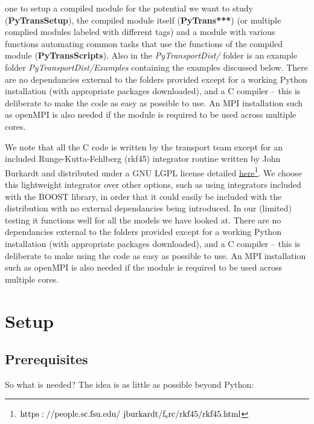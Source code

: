 \documentclass[10pt,
amsmath,amssymb,
aps,prd,nofootinbib,eqsecnum,a4paper]{revtex4}
\newcommand{\CC}{C\nolinebreak\hspace{-.05em}\raisebox{.4ex}{\tiny\bf +}\nolinebreak\hspace{-.10em}\raisebox{.4ex}{\tiny\bf +}}
\def\CC{{C\nolinebreak[4]\hspace{-.05em}\raisebox{.4ex}{\tiny\bf ++}}}
\def\S{ }
\begin{document}
one to setup a compiled module for the potential we want to study ({\bf PyTransSetup}), the compiled module itself ({\bf PyTrans***}) 
(or multiple complied modules labeled with different tags) and a 
module with various functions automating common tasks that 
use the functions of the compiled module ({\bf PyTransScripts}). 
Also in the {\it PyTransportDist/} folder is an example folder {\it PyTransportDist/Examples} 
containing the examples discussed below. 
There are no dependancies external to the folders provided except for a working Python 
installation (with appropriate packages downloaded), and a \CC \S compiler -- this is deliberate to make 
the code as easy as possible to use.
An MPI installation such as openMPI is also needed if the module is required to be 
used across multiple cores. 



We note that all the \CC \S  code is written by the transport team except for an included Runge-Kutta-Fehlberg (rkf45)
integrator routine written by John Burkardt and distributed under a GNU LGPL license detailed \href{https://people.sc.fsu.edu/~jburkardt/f_src/rkf45/rkf45.html}{here}\footnote{$\rm https://people.sc.fsu.edu/~jburkardt/f_src/rkf45/rkf45.html$}.  We choose this lightweight integrator over other options, such as using integrators included with 
the BOOST library, in order that it could easily be included with the distribution with no external dependancies being introduced. 
In our (limited) testing it functions well for all the models we have looked at.
There are no dependancies external to the folders provided except for a working Python 
installation (with appropriate packages downloaded), and a \CC \S compiler -- this is deliberate to make 
using the code as easy as possible to use.
An MPI installation such as openMPI is also needed if the module is required to be 
used across multiple cores. 

\section{Setup}
\label{Setup}

\subsection {Prerequisites} 

\noindent  So what is needed? The idea is as little as possible beyond Python:
\end{document}
